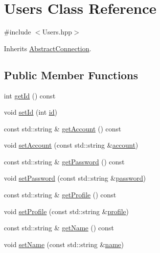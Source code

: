 \hypertarget{class_users}{}\section{Users Class Reference}
\label{class_users}


{\ttfamily \#include $<$Users.\+hpp$>$}



Inherits \hyperlink{class_abstract_connection}{Abstract\+Connection}.

\subsection*{Public Member Functions}
\begin{DoxyCompactItemize}
\item 
int \hyperlink{class_users_a73febb7bc50fffd0178cef2d24b71f57}{get\+Id} () const
\item 
void \hyperlink{class_users_a296ca7955e48886c4e462f8fa082346a}{set\+Id} (int \hyperlink{class_users_a9227a9e924b546e37b745aa152d7ca23}{id})
\item 
const std\+::string \& \hyperlink{class_users_ac7de9540bae619943ddd748118d8655e}{get\+Account} () const
\item 
void \hyperlink{class_users_a2317c0ff6787563b72a5fb5a22611edd}{set\+Account} (const std\+::string \&\hyperlink{class_users_a87b8bab72f85ca29b666142ae23dbc3c}{account})
\item 
const std\+::string \& \hyperlink{class_users_af207ce1e4f918448b633b4456e3c8a75}{get\+Password} () const
\item 
void \hyperlink{class_users_a6e42d23b9d8e0664e93fdbdff4e36dad}{set\+Password} (const std\+::string \&\hyperlink{class_users_a7f0ae4b423977cc0168c50e0b5be93e4}{password})
\item 
const std\+::string \& \hyperlink{class_users_adcb2ccba1daff8a93097f33386c31785}{get\+Profile} () const
\item 
void \hyperlink{class_users_a8a7ee3fff2451e53623de00ec131e29c}{set\+Profile} (const std\+::string \&\hyperlink{class_users_a133880ef122466073e9c97755c809ae9}{profile})
\item 
const std\+::string \& \hyperlink{class_users_a51fc6ec262ea9e53744702a983349388}{get\+Name} () const
\item 
void \hyperlink{class_users_a5b1caf71b472b3215f232de13094b853}{set\+Name} (const std\+::string \&\hyperlink{class_users_abfa55c64dfc5548eb796e163633404d2}{name})
\item 

\end{DoxyCompactItemize}
